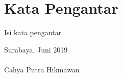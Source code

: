 \chapter{Kata Pengantar}
		Isi kata pengantar

		\hfill Surabaya, Juni 2019 \\ \\
		
		\hfill Cahya Putra Hikmawan